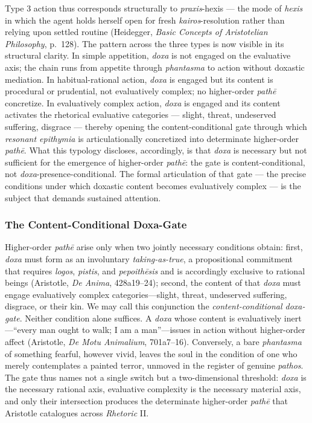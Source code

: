 \documentclass{article}
\begin{document}
Type 3 action thus corresponds structurally to \textit{praxis}-hexis --- the mode of \textit{hexis} in which the agent holds herself open for fresh \textit{kairos}-resolution rather than relying upon settled routine (Heidegger, \textit{Basic Concepts of Aristotelian Philosophy}, p.~128). The pattern across the three types is now visible in its structural clarity. In simple appetition, \textit{doxa} is not engaged on the evaluative axis; the chain runs from appetite through \textit{phantasma} to action without doxastic mediation. In habitual-rational action, \textit{doxa} is engaged but its content is procedural or prudential, not evaluatively complex; no higher-order \textit{path\=e} concretize. In evaluatively complex action, \textit{doxa} is engaged and its content activates the rhetorical evaluative categories --- slight, threat, undeserved suffering, disgrace --- thereby opening the content-conditional gate through which \textit{resonant epithymia} is articulationally concretized into determinate higher-order \textit{path\=e}. What this typology discloses, accordingly, is that \textit{doxa} is necessary but not sufficient for the emergence of higher-order \textit{path\=e}: the gate is content-conditional, not \textit{doxa}-presence-conditional. The formal articulation of that gate --- the precise conditions under which doxastic content becomes evaluatively complex --- is the subject that demands sustained attention.


\subsubsection*{The Content-Conditional Doxa-Gate}

Higher-order \textit{pathē} arise only when two jointly necessary conditions obtain: first, \textit{doxa} must form as an involuntary \textit{taking-as-true}, a propositional commitment that requires \textit{logos}, \textit{pistis}, and \textit{pepoithēsis} and is accordingly exclusive to rational beings (Aristotle, \textit{De Anima}, 428a19--24); second, the content of that \textit{doxa} must engage evaluatively complex categories---slight, threat, undeserved suffering, disgrace, or their kin. We may call this conjunction the \textit{content-conditional doxa-gate}. Neither condition alone suffices. A \textit{doxa} whose content is evaluatively inert---``every man ought to walk; I am a man''---issues in action without higher-order affect (Aristotle, \textit{De Motu Animalium}, 701a7--16). Conversely, a bare \textit{phantasma} of something fearful, however vivid, leaves the soul in the condition of one who merely contemplates a painted terror, unmoved in the register of genuine \textit{pathos}. The gate thus names not a single switch but a two-dimensional threshold: \textit{doxa} is the necessary rational axis, evaluative complexity is the necessary material axis, and only their intersection produces the determinate higher-order \textit{pathē} that Aristotle catalogues across \textit{Rhetoric} II.
\end{document}
